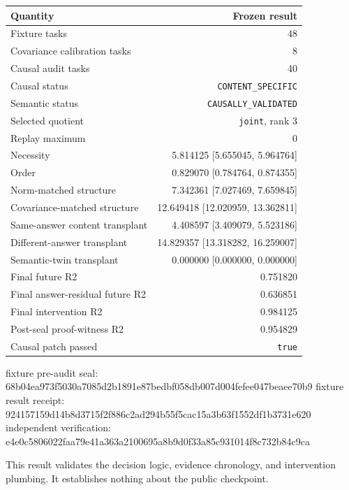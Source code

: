 \documentclass[
  10pt,
]{article}
\newenvironment{Shaded}{}{}
\newcommand{\NormalTok}[1]{#1}
\begin{document}
\begin{longtable}[]{@{}lr@{}}
\toprule\noalign{}
Quantity & Frozen result \\
\midrule\noalign{}
\endhead
\bottomrule\noalign{}
\endlastfoot
Fixture tasks & 48 \\
Covariance calibration tasks & 8 \\
Causal audit tasks & 40 \\
Causal status & \texttt{CONTENT\_SPECIFIC} \\
Semantic status & \texttt{CAUSALLY\_VALIDATED} \\
Selected quotient & \texttt{joint}, rank 3 \\
Replay maximum & 0 \\
Necessity & 5.814125 {[}5.655045, 5.964764{]} \\
Order & 0.829070 {[}0.784764, 0.874355{]} \\
Norm-matched structure & 7.342361 {[}7.027469, 7.659845{]} \\
Covariance-matched structure & 12.649418 {[}12.020959, 13.362811{]} \\
Same-answer content transplant & 4.408597 {[}3.409079, 5.523186{]} \\
Different-answer transplant & 14.829357 {[}13.318282, 16.259007{]} \\
Semantic-twin transplant & 0.000000 {[}0.000000, 0.000000{]} \\
Final future R2 & 0.751820 \\
Final answer-residual future R2 & 0.636851 \\
Final intervention R2 & 0.984125 \\
Post-seal proof-witness R2 & 0.954829 \\
Causal patch passed & \texttt{true} \\
\end{longtable}

\begin{Shaded}
\begin{Highlighting}[]
\NormalTok{fixture pre{-}audit seal: 68b04ea973f5030a7085d2b1891e87bedbf058db007d004fefee047beaee70b9}
\NormalTok{fixture result receipt: 924157159d14b8d3715f2f886c2ad294b55f5cac15a3b63f1552df1b3731e620}
\NormalTok{independent verification: e4e0c5806022faa79e41a363a2100695a8b9d0f33a85c931014f8c732b84c9ca}
\end{Highlighting}
\end{Shaded}

This result validates the decision logic, evidence chronology, and
intervention plumbing. It establishes nothing about the public
checkpoint.
\end{document}
